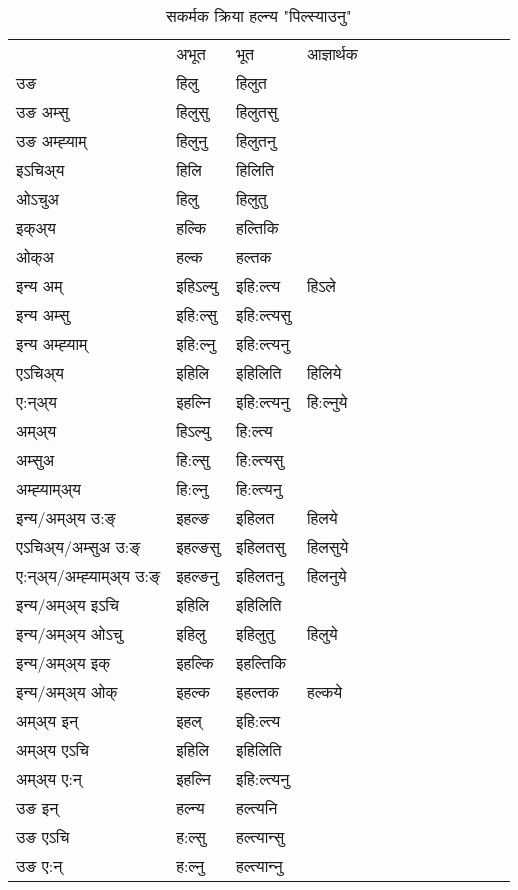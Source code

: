 \begin{table}[H]
\centering
\caption{\label{il.vt} सकर्मक क्रिया  हल्न्य  "पिल्स्याउनु"  }
\begin{tabular}{l|l|l|l|l|l|l|l|l|l|l|l|l}  \toprule
&अभूत & भूत & आज्ञार्थक \\ 
उङ &हिलु &हिलुत \\ 
उङ अम्सु &हिलुसु &हिलुतसु \\ 
उङ अम्ह्‍याम् &हिलुनु &हिलुतनु \\ 
इऽचिअ्य &हिलि &हिलिति   \\ 
ओऽचुअ &हिलु &हिलुतु   \\ 
इक्अ्य &हल्कि &हल्तिकि   \\ 
ओक्अ &हल्क &हल्तक   \\ 
इन्य अम् & इहिऽल्यु  & इहि:ल्त्य &हिऽले  \\ 
इन्य अम्सु & इहि:ल्सु  & इहि:ल्त्यसु   \\ 
इन्य अम्ह्‍याम् & इहि:ल्नु  & इहि:ल्त्यनु   \\ 
एऽचिअ्य & इहिलि & इहिलिति &हिलिये    \\ 
ए:न्अ्य & इहल्नि  & इहि:ल्त्यनु &हि:ल्नुये  \\ 
अम्अ्य & हिऽल्यु  & हि:ल्त्य  \\ 
अम्सुअ & हि:ल्सु & हि:ल्त्यसु  \\ 
अम्ह्‍याम्अ्य & हि:ल्नु  & हि:ल्त्यनु \\ 
\midrule
इन्य/अम्अ्य उ:ङ्‌&इहल्ङ & इहिलत &हिलये \\ 
एऽचिअ्य/अम्सुअ उ:ङ्‌ &इहल्ङसु & इहिलतसु &हिलसुये \\ 
ए:न्अ्य/अम्ह्‍याम्अ्य उ:ङ्‌ &इहल्ङनु & इहिलतनु &हिलनुये \\ 
इन्य/अम्अ्य इऽचि & इहिलि & इहिलिति    \\ 
इन्य/अम्अ्य ओऽचु & इहिलु & इहिलुतु  &हिलुये  \\ 
इन्य/अम्अ्य इक् & इहल्कि & इहल्तिकि   \\ 
इन्य/अम्अ्य ओक् & इहल्क & इहल्तक  &हल्कये  \\ 
अम्अ्य इन् & इहल् & इहि:ल्त्य   \\ 
अम्अ्य एऽचि & इहिलि & इहिलिति    \\ 
अम्अ्य ए:न् & इहल्नि  & इहि:ल्त्यनु  \\ 
\midrule
उङ इन् & हल्न्य  & हल्त्यनि  \\ 
उङ एऽचि & ह:ल्सु  & हल्त्यान्सु   \\ 
उङ ए:न्& ह:ल्नु  & हल्त्यान्‍नु   \\ 
\bottomrule
\end{tabular}
\end{table}



